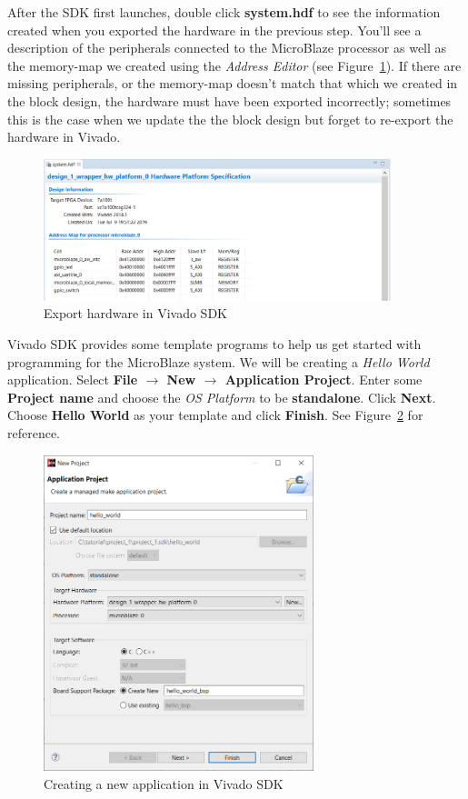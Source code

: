 \documentclass[11pt]{article}
\begin{document}
After the SDK first launches, double click \textbf{system.hdf} to see the information created when you exported the hardware in the previous step. You'll see a description of the peripherals connected to the MicroBlaze processor as well as the memory-map we created using the \textit{Address Editor} (see Figure~\ref{fig:export_hdf}). If there are missing peripherals, or the memory-map doesn't match that which we created in the block design, the hardware must have been exported incorrectly; sometimes this is the case when we update the the block design but forget to re-export the hardware in Vivado.

\begin{figure}[h]
    \centering
    \includegraphics[width=0.9\textwidth]{images/export_hdf.png}
    \caption{Export hardware in Vivado SDK}
    \label{fig:export_hdf}
\end{figure}

Vivado SDK provides some template programs to help us get started with programming for the MicroBlaze system. We will be creating a \textit{Hello World} application. Select \textbf{File $\rightarrow$ New $\rightarrow$ Application Project}. Enter some \textbf{Project name} and choose the \textit{OS Platform} to be \textbf{standalone}. Click \textbf{Next}. Choose \textbf{Hello World} as your template and click \textbf{Finish}. See Figure~\ref{fig:new_app_hello} for reference.

\begin{figure}[h]
    \centering
    \includegraphics[width=0.7\textwidth]{images/new_app_hello.png}
    \caption{Creating a new application in Vivado SDK}
    \label{fig:new_app_hello}
\end{figure}
\end{document}

